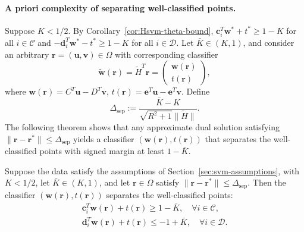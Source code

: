 \documentclass[twoside,11pt]{article}
\renewcommand{\c}{\bm{c}}
\renewcommand{\d}{\bm{d}}
\renewcommand\r{\bm{r}}
\renewcommand\u{\bm{u}}
\renewcommand\v{\bm{v}}
\newcommand\w{\bm{w}}
\newcommand\e{\bm{e}}
\newcommand\CC{\mathcal{C}}
\newcommand\DD{\mathcal{D}}
\newcommand\tw{\tilde{\w}}
\newcommand\tH{\tilde{H}}
\newcommand\sep{\mathrm{sep}}
\begin{document}
\paragraph{A priori complexity of separating well-classified points.}
Suppose $K < 1/2$. By Corollary~\ref{cor:Hsvm-theta-bound}, $\c_i^T\w^* + t^* \geq 1 - K$ for all $i \in \CC$ and $-\d_i^T\w^* - t^* \geq 1 - K$ for all $i \in \DD$. Let $\bar{K} \in (K,1)$, and consider an arbitrary $\r = (\u,\v) \in \Omega$ with corresponding classifier 
    \[
        \tw(\r) = \tH^T\r = \begin{pmatrix}
            \w(\r)\\
            t(\r)
        \end{pmatrix},
    \]
    where $\w(\r) = C^T\u - D^T\v$, $t(\r) = \e^T\u - \e^T\v$.  
    Define
    \begin{equation} \label{eqn:Hsvm-delta}
        \Delta_{\sep} := \frac{\bar{K} - K}{\sqrt{R^2 + 1}\|\tilde{H}\|}.
    \end{equation}
    The following theorem shows that any approximate dual solution satisfying $\|\r - \r^*\| \leq \Delta_{\sep}$ yields a classifier $(\w(\r),t(\r))$ that separates the well-classified points with signed margin at least $1-\bar{K}$.
    \begin{theorem} \label{thm:Hsvm-separation-theorem}
      Suppose the data satisfy the assumptions of Section~\ref{sec:svm-assumptions}, with $K < 1/2$, let $\bar{K} \in (K,1)$, and let $\r \in \Omega$ satisfy $\|\r - \r^*\| \leq \Delta_{\sep}$. Then the classifier $(\w(\r),t(\r))$ separates the well-classified points:
      \begin{align*}
        \c_i^T\w(\r) + t(\r) \geq 1 - \bar{K},\quad\forall i \in \CC,\\
        \d_i^T\w(\r) + t(\r) \leq -1 + \bar{K},\quad\forall i \in \DD.
      \end{align*}
    \end{theorem}
\end{document}
